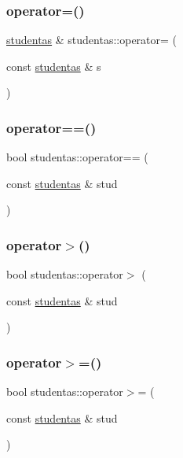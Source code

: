 \subsubsection{\texorpdfstring{operator=()}{operator=()}}
{\footnotesize\ttfamily \mbox{\hyperlink{classstudentas}{studentas}} \& studentas\+::operator= (\begin{DoxyParamCaption}\item[{const \mbox{\hyperlink{classstudentas}{studentas}} \&}]{s }\end{DoxyParamCaption})}

\mbox{\label{classstudentas_a7d6128edc9139ee3ae15b9aad30e9a1b}} 
\subsubsection{\texorpdfstring{operator==()}{operator==()}}
{\footnotesize\ttfamily bool studentas\+::operator== (\begin{DoxyParamCaption}\item[{const \mbox{\hyperlink{classstudentas}{studentas}} \&}]{stud }\end{DoxyParamCaption})}

\mbox{\label{classstudentas_a1ce1563364b0b88512c2dc793ac688bf}} 
\subsubsection{\texorpdfstring{operator$>$()}{operator>()}}
{\footnotesize\ttfamily bool studentas\+::operator$>$ (\begin{DoxyParamCaption}\item[{const \mbox{\hyperlink{classstudentas}{studentas}} \&}]{stud }\end{DoxyParamCaption})}

\mbox{\label{classstudentas_a4112fca61c65de68011b8abb6a5aaa54}} 
\subsubsection{\texorpdfstring{operator$>$=()}{operator>=()}}
{\footnotesize\ttfamily bool studentas\+::operator$>$= (\begin{DoxyParamCaption}\item[{const \mbox{\hyperlink{classstudentas}{studentas}} \&}]{stud }\end{DoxyParamCaption})}

